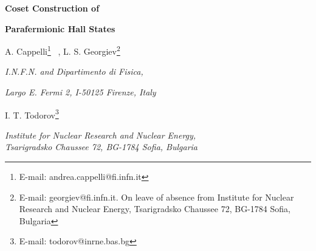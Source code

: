 \documentclass[a4paper,12pt]{article}
\def \Z {{\mathbb Z}}
\begin{document}


\begin{center}
{\LARGE\bf Coset Construction of}

\vspace{.4cm}

{\LARGE\bf Parafermionic Hall States}

\vspace{.6cm}

A. Cappelli\footnote{E-mail: andrea.cappelli@fi.infn.it} \ ,
\qquad L. S. Georgiev\footnote{E-mail: georgiev@fi.infn.it.
On leave of absence from Institute for Nuclear
Research and Nuclear Energy, Tsarigradsko Chaussee 72,
BG-1784 Sofia, Bulgaria}

\vspace{.1cm}

\normalsize\textit{ I.N.F.N. and Dipartimento di Fisica,}

\normalsize\textit{ Largo E. Fermi 2, I-50125 Firenze, Italy}

\vspace{.3cm}

I. T. Todorov\footnote{E-mail: todorov@inrne.bas.bg}

\vspace{.1cm}

\normalsize\textit{ Institute for Nuclear Research and Nuclear Energy,}
\\
\normalsize\textit{ Tsarigradsko Chaussee 72, BG-1784 Sofia, Bulgaria}
\end{center}

\vspace{.3cm}



\begin{abstract}
Fractional quantum Hall fluids with fillings $2 < \nu <3$
have been recently proposed which 
generalize the Pfaffian state ($\nu=2+1/2$) into a hierarchy of
states with parafermionic excitations. 
We describe here the corresponding  $\Z_k$-parafermion conformal 
field theory by means of the coset construction 
$\widehat{su(k)_1}\oplus\widehat{su(k)_1}/\widehat{su(k)_2}$.
This extends our earlier derivation of the Pfaffian state
from a ``parent'' state with abelian affine symmetry plus a 
projection of degrees of freedom.
The numerator of the coset
is actually a rational conformal field theory made out of
$(2k-2)$ scalar fields and a specific extended symmetry.
The coset construction projects out some neutral Hall edge excitations 
while preserving the filling fraction; it also respects the $\Z_k$ parity rule 
coupling neutral and charged excitations in the parent abelian theory.
\end{abstract}
\end{document}
